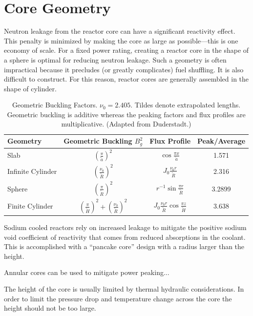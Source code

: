 \section{Core Geometry}
Neutron leakage from the reactor core can have a significant reactivity effect.
This penalty is minimized by making the core as large as possible---this is one economy of scale. For a fixed power rating, creating a reactor core in the shape of a sphere is optimal for reducing neutron leakage.
Such a geometry is often impractical because it precludes (or greatly complicates) fuel shuffling. It is also difficult to construct.
For this reason, reactor cores are generally assembled in the shape of cylinder.

\begin{table}
\centering
\large
\caption{Geometric Buckling Factors. $\nu_0=2.405$. Tildes denote extrapolated lengths. Geometric buckling is additive whereas the peaking factors and flux profiles are multiplicative. (Adapted from Duderstadt.)}
\begin{tabular}{lccc}
\hline
Geometry & Geometric Buckling $B_g^2$ & Flux Profile & Peak/Average \\
\hline
Slab & $\left( \frac{\pi}{\tilde{a}} \right)^2$ & $\cos \frac{\pi x}{\tilde{a}}$ & 1.571\\
Infinite Cylinder & $\left( \frac{\nu _0}{\tilde{R}} \right)^2$ & $J_0 \frac{\nu_0 r}{\tilde{R}}$ & 2.316\\
Sphere & $\left( \frac{\pi}{\tilde{R}} \right)^2$ & $r^{-1}\sin \frac{\pi r}{\tilde{R}}$ & 3.2899\\ 
Finite Cylinder & $\left( \frac{\pi}{\tilde{H}} \right)^2 + \left( \frac{\nu _0}{\tilde{R}}
     \right)^2$    & $J_0 \frac{\nu_0 r}{\tilde{R}} \cos \frac{\pi z}{\tilde{H}}$ & 3.638\\
\hline

\end{tabular}
\end{table}

Sodium cooled reactors rely on increased leakage to mitigate the positive sodium void coefficient of reactivity that comes from reduced absorptions in the coolant.
This is accomplished with a ``pancake core'' design with a radius larger than the height.


Annular cores can be used to mitigate power peaking...

The height of the core is usually limited by thermal hydraulic considerations. 
In order to limit the pressure drop and temperature change across the core the height should not be too large.







